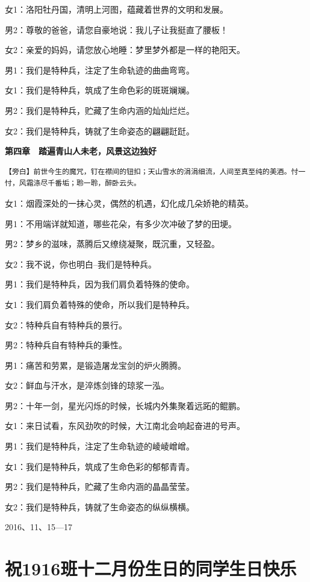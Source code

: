 \documentclass[openany]{ctexbook}
\begin{document}
女1：洛阳牡丹国，清明上河图，蕴藏着世界的文明和发展。

男2：尊敬的爸爸，请您自豪地说：我儿子让我挺直了腰板！

女2：亲爱的妈妈，请您放心地睡：梦里梦外都是一样的艳阳天。

男1：我们是特种兵，注定了生命轨迹的曲曲弯弯。

女1：我们是特种兵，筑成了生命色彩的斑斑斓斓。

男2：我们是特种兵，贮藏了生命内涵的灿灿烂烂。

女2：我们是特种兵，铸就了生命姿态的翩翩跹跹。

\textbf{第四章　踏遍青山人未老，风景这边独好}

\begin{verbatim}
【旁白】前世今生的魔咒，钉在襟间的钮扣；天山雪水的涓涓细流，人间至真至纯的美酒。忖一忖，风霜涤尽千番垢；聆一聆，醉卧云头。
\end{verbatim}

女1：烟霞深处的一抹心灵，偶然的机遇，幻化成几朵娇艳的精英。

男1：不用端详就知道，哪些花朵，有多少次冲破了梦的田埂。

男2：梦乡的滋味，蒸腾后又缭绕凝聚，既沉重，又轻盈。

女2：我不说，你也明白--我们是特种兵。

男1：我们是特种兵，因为我们肩负着特殊的使命。

女1：我们肩负着特殊的使命，所以我们是特种兵。

女2：特种兵自有特种兵的景行。

男2：特种兵自有特种兵的秉性。

男1：痛苦和劳累，是锻造屠龙宝剑的炉火腾腾。

女2：鲜血与汗水，是淬炼剑锋的琼浆一泓。

男2：十年一剑，星光闪烁的时候，长城内外集聚着远跖的鲲鹏。

女1：来日试看，东风劲吹的时候，大江南北会响起奋进的号声。

男1：我们是特种兵，注定了生命轨迹的崚崚嶒嶒。

女1：我们是特种兵，筑成了生命色彩的郁郁青青。

男2：我们是特种兵，贮藏了生命内涵的晶晶莹莹。

女2：我们是特种兵，铸就了生命姿态的纵纵横横。

2016、11、15---17

\chapter*{祝1916班十二月份生日的同学生日快乐}\label{birthday12}
\end{document}
